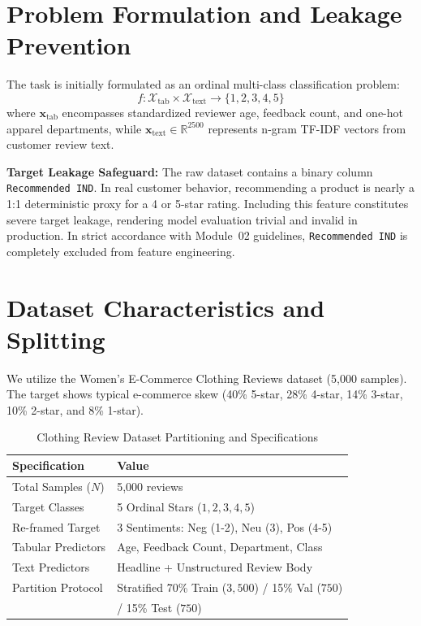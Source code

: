 \documentclass[10pt,journal,compsoc,twocolumn]{IEEEtran}
\begin{document}
\section{Problem Formulation and Leakage Prevention}
The task is initially formulated as an ordinal multi-class classification problem:
\begin{equation}
f: \mathcal{X}_{\text{tab}} \times \mathcal{X}_{\text{text}} \to \{1, 2, 3, 4, 5\}
\end{equation}
where $\mathbf{x}_{\text{tab}}$ encompasses standardized reviewer age, feedback count, and one-hot apparel departments, while $\mathbf{x}_{\text{text}} \in \mathbb{R}^{2500}$ represents n-gram TF-IDF vectors from customer review text.

\textbf{Target Leakage Safeguard:} The raw dataset contains a binary column \texttt{Recommended IND}. In real customer behavior, recommending a product is nearly a 1:1 deterministic proxy for a 4 or 5-star rating. Including this feature constitutes severe target leakage, rendering model evaluation trivial and invalid in production. In strict accordance with Module~02 guidelines, \texttt{Recommended IND} is completely excluded from feature engineering.

\section{Dataset Characteristics and Splitting}
We utilize the Women's E-Commerce Clothing Reviews dataset (5,000 samples). The target shows typical e-commerce skew (40\% 5-star, 28\% 4-star, 14\% 3-star, 10\% 2-star, and 8\% 1-star).

\begin{table}[htbp]
\centering
\caption{Clothing Review Dataset Partitioning and Specifications}
\label{tab:b3_stats}
\begin{tabular}{ll}
\toprule
\textbf{Specification} & \textbf{Value} \\
\midrule
Total Samples ($N$) & 5,000 reviews \\
Target Classes & 5 Ordinal Stars ($1, 2, 3, 4, 5$) \\
Re-framed Target & 3 Sentiments: Neg (1-2), Neu (3), Pos (4-5) \\
Tabular Predictors & Age, Feedback Count, Department, Class \\
Text Predictors & Headline + Unstructured Review Body \\
Partition Protocol & Stratified 70\% Train ($3,500$) / 15\% Val ($750$) \\
                   & / 15\% Test ($750$) \\
\bottomrule
\end{tabular}
\end{table}
\end{document}
